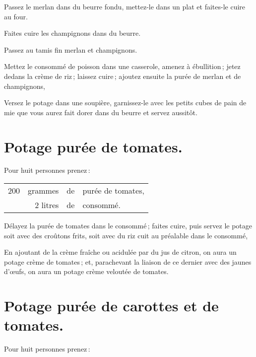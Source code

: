 Passez le merlan dans du beurre fondu, mettez-le dans un plat et faites-le
cuire au four.

Faites cuire les champignons dans du beurre.

Passez au tamis fin merlan et champignons.

Mettez le consommé de poisson dans une casserole, amenez à ébullition ; jetez
dedans la crème de riz ; laissez cuire ; ajoutez ensuite la purée de merlan et
de champignons,

Versez le potage dans une soupière, garnissez-le avec les petits cubes de pain
de mie que vous aurez fait dorer dans du beurre et servez aussitôt.

\section*{\centering Potage purée de tomates.}

Pour huit personnes prenez :

\medskip

\footnotesize
\begin{longtable}{rrrp{16em}}                                                    
  200 & grammes   & de  & purée de tomates,                                                               \\
      &  2 litres & de  & consommé.                                                                       \\
\end{longtable}
\normalsize

Délayez la purée de tomates dans le consommé ; faites cuire, puis servez le
potage soit avec des croûtons frits, soit avec du riz cuit au préalable dans le
consommé,

\sk

En ajoutant de la crème fraîche ou acidulée par du jus de citron, on aura un
potage crème de tomates ; et, parachevant la liaison de ce dernier avec des
jaunes d'œufs, on aura un potage crème veloutée de tomates.

\section*{\centering Potage purée de carottes et de tomates.}

Pour huit personnes prenez :

